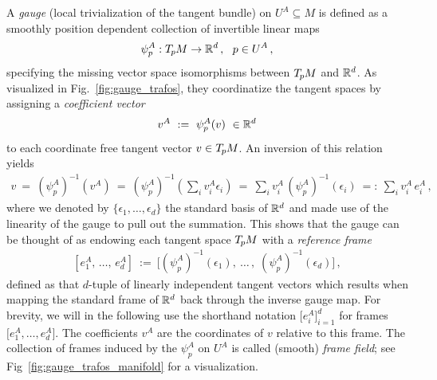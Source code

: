A \emph{gauge} (local trivialization of the tangent bundle) on $U^A\subseteq M$ is defined as a smoothly position dependent collection of invertible linear maps
\begin{align}\label{eq:gauge_definition}
    \psi_p^A:T_{\mkern-1.5mu p}\mkern-.5muM\to\mathbb{R}^d \,,\ \ p\in U^A \,,
\end{align}
specifying the missing vector space isomorphisms between $T_{\mkern-1.5mu p}\mkern-.5muM$ and $\mathbb{R}^d$.
As visualized in Fig.~\ref{fig:gauge_trafos}, they coordinatize the tangent spaces by assigning a \emph{coefficient vector}
\begin{align}
    v^A\ :=\ \psi_p^A(v) \ \in\mathbb{R}^d
\end{align}
to each coordinate free tangent vector $v\in T_{\mkern-1.5mu p}\mkern-.5muM$.
An inversion of this relation yields
\begin{align}
    v\ =\ \left(\psi_p^A\right)^{-1}\! (v^A)
     \ =\ \left(\psi_p^A\right)^{-1}\!\! \left(\sum\nolimits_i v_i^A \epsilon_i\right)
     \ =\ \sum\nolimits_i v_i^A\, \left(\psi_p^A\right)^{-1}\!(\epsilon_i)
     \ =:\ \sum\nolimits_i v_i^A\, e_i^A \,,
\end{align}
where we denoted by $\{\epsilon_1,\dots,\epsilon_d\}$ the standard basis of $\mathbb{R}^d$ and made use of the linearity of the gauge to pull out the summation.
This shows that the gauge can be thought of as endowing each tangent space $T_{\mkern-1.5mu p}\mkern-.5muM$ with a \emph{reference frame}
\begin{align}\label{eq:framefield_gauge_equivalence}
    \left[e^A_{1}, \,\dots,\, e^A_{d}\right]
    \ :=\ \Big[(\psi_p^A)^{-1}(\epsilon_1), \:\dots\,,\; (\psi_p^A)^{-1}(\epsilon_d)\Big] \,,
\end{align}
defined as that $d$-tuple of linearly independent tangent vectors which results when mapping the standard frame of $\mathbb{R}^d$ back through the inverse gauge map.
For brevity, we will in the following use the shorthand notation $\big[e_i^A \big]_{i=1}^d$ for frames $\big[e_1^A, \dots, e_d^A \big]$.
The coefficients $v^A$ are the coordinates of $v$ relative to this frame.
The collection of frames induced by the $\psi_p^A$ on $U^A$ is called (smooth) \emph{frame field}; see Fig~\ref{fig:gauge_trafos_manifold} for a visualization.


